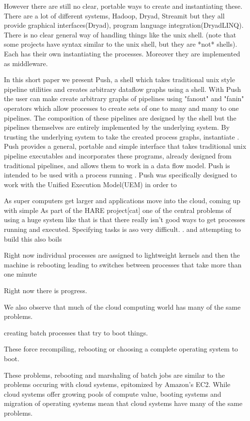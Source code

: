 \documentclass{sig-alt-release2}
\begin{document}
However there are still no clear, portable ways to create and instantiating these. There are a lot of different systems, Hadoop, Dryad, Streamit but they all provide graphical interfaces(Dryad), program language integration(DryadLINQ). There is no clear general way of handling things like the unix shell. (note that some projects have syntax similar to the unix shell, but they are *not* shells).  Each has their own instantiating the processes. Moreover they are implemented as middleware. 

In this short paper we present Push, a shell which takes traditional unix style pipeline utilities and creates arbitrary dataflow graphs using a shell. With Push the user can make create arbitrary graphs of pipelines using "fanout" and "fanin" operators which allow processes to create sets of one to many and many to one pipelines. The composition of these pipelines are designed by the shell but the pipelines themselves are entirely implemented by the underlying system. By trusting the underlying system to take the created process graphs, instantiate . Push provides a general, portable and simple interface that takes traditional unix pipeline executables and incorporates these programs, already designed from traditional pipelines, and allows them to work in a data flow model. Push is intended to be used with a process running . Push was specifically designed to work with the Unified Execution Model(UEM)\cite{} in order to 


As super computers get larger and applications move into the cloud, coming up with simple 
As part of the HARE project[cat] one of the central problems of using a huge system like that is that there really isn't good ways to get processes running and executed. Specifying tasks is aso very difficult. . and attempting to build this also boils 

Right now individual processes are assigned to lightweight kernels and then the machine is rebooting leading to switches between processes that take more than one minute \cite{colorad}

Right now there is progress. 

We also observe that much of the cloud computing world has many of the same problems. 

creating batch processes that try to boot things. 

These force recompiling, rebooting or choosing a complete operating system to boot. 

These problems, rebooting and marshaling of batch jobs are similar to the problems occuring with cloud systems, epitomized by Amazon's EC2. While cloud systems offer growing pools of compute value, booting systems and migration of operating systems mean that cloud systems have many of the same problems. 
\end{document}
